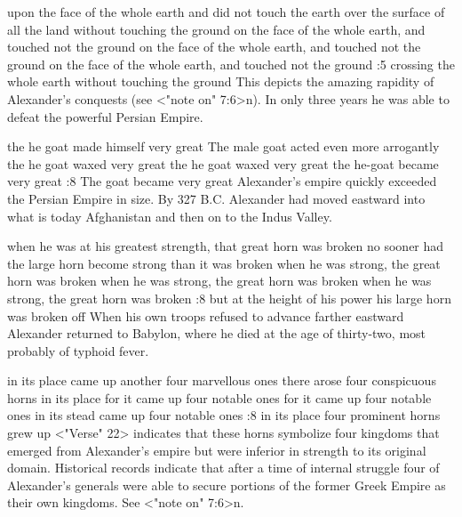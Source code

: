     {upon the face of the whole earth and did not touch the earth} %
    {over the surface of all the land without touching the ground} %
    {on the face of the whole earth, and touched not the ground} %
    {on the face of the whole earth, and touched not the ground} %
    {on the face of the whole earth, and touched not the ground} %
:5 {crossing the whole  earth without touching the ground} This depicts the amazing 
rapidity of Alexander's conquests (see <"note on" 7:6>n). In only three 
years he was able to defeat the powerful Persian Empire.

    {the he goat made himself very great} %
    {The male goat acted even more arrogantly} %
    {the he goat waxed very great} %
    {the he goat waxed very great} %
    {the he-goat became very great} %
:8 {The goat became very great} Alexander's empire quickly 
exceeded the Persian Empire in size. By 327 B.C. Alexander had 
moved eastward into what is today Afghanistan and then on to the 
Indus Valley.


    {when he was at his greatest strength, that great horn was broken} %
    {no sooner had the large horn become strong than it was broken} %
    {when he was strong, the great horn was broken} %
    {when he was strong, the great horn was broken} %
    {when he was strong, the great horn was broken} %
:8 {but at the height of his power his large horn was broken off}
When his own troops refused to advance farther eastward Alexander returned to Babylon,
where he died at the age of thirty-two, most probably of typhoid fever.

    {in its place came up another four marvellous ones} %
    {there arose four conspicuous horns in its place} %
    {for it came up four notable ones} %
    {for it came up four notable ones} %
    {in its stead came up four notable ones} %
:8 {in its place four prominent horns grew up} <"Verse" 22>
indicates that these horns symbolize four kingdoms that 
emerged from Alexander's empire but were inferior in strength to 
its original domain. Historical records indicate that after a time of 
internal struggle four of Alexander's generals were able to secure 
portions of the former Greek Empire as their own kingdoms. See 
<"note on" 7:6>n.


